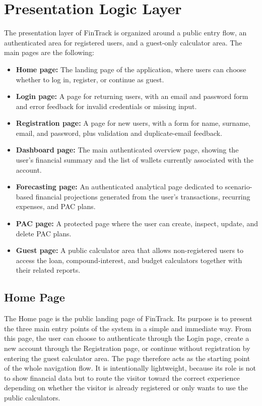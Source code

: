 \section{Presentation Logic Layer}

The presentation layer of FinTrack is organized around a public entry flow, an authenticated area for registered users, and a guest-only calculator area. The main pages are the following:
\begin{itemize}
    \item \textbf{Home page:} The landing page of the application, where users can choose whether to log in, register, or continue as guest.
    \item \textbf{Login page:} A page for returning users, with an email and password form and error feedback for invalid credentials or missing input.
    \item \textbf{Registration page:} A page for new users, with a form for name, surname, email, and password, plus validation and duplicate-email feedback.
    \item \textbf{Dashboard page:} The main authenticated overview page, showing the user's financial summary and the list of wallets currently associated with the account.
    \item \textbf{Forecasting page:} An authenticated analytical page dedicated to scenario-based financial projections generated from the user's transactions, recurring expenses, and PAC plans.
    \item \textbf{PAC page:} A protected page where the user can create, inspect, update, and delete PAC plans.
    \item \textbf{Guest page:} A public calculator area that allows non-registered users to access the loan, compound-interest, and budget calculators together with their related reports.
\end{itemize}

\clearpage
\subsection{Home Page}

The Home page is the public landing page of FinTrack. Its purpose is to present the three main entry points of the system in a simple and immediate way. From this page, the user can choose to authenticate through the Login page, create a new account through the Registration page, or continue without registration by entering the guest calculator area.
\noindent
The page therefore acts as the starting point of the whole navigation flow. It is intentionally lightweight, because its role is not to show financial data but to route the visitor toward the correct experience depending on whether the visitor is already registered or only wants to use the public calculators.

